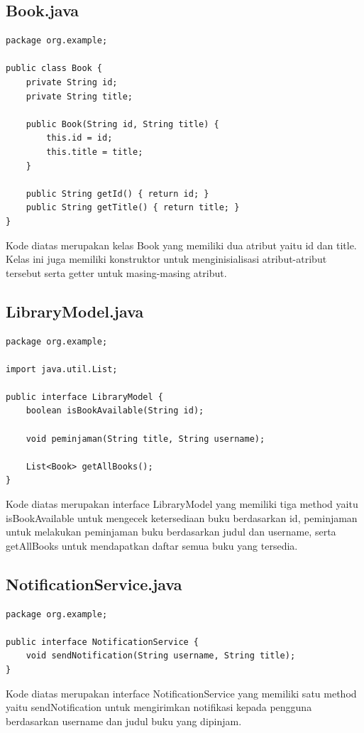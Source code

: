 \documentclass[a4paper,12pt]{article}
\begin{document}
\subsection{Book.java}
\begin{lstlisting}[style=javastyle, caption={Book.java}]
package org.example;

public class Book {
    private String id;
    private String title;

    public Book(String id, String title) {
        this.id = id;
        this.title = title;
    }

    public String getId() { return id; }
    public String getTitle() { return title; }
}
\end{lstlisting}

Kode diatas merupakan kelas Book yang memiliki dua atribut yaitu id dan title. Kelas ini juga memiliki konstruktor untuk menginisialisasi atribut-atribut tersebut serta getter untuk masing-masing atribut.

\subsection{LibraryModel.java}\label{one}
\begin{lstlisting}[style=javastyle, caption={LibraryModel.java}]
package org.example;

import java.util.List;

public interface LibraryModel {
    boolean isBookAvailable(String id);

    void peminjaman(String title, String username);

    List<Book> getAllBooks();
}
\end{lstlisting}

Kode diatas merupakan interface LibraryModel yang memiliki tiga method yaitu isBookAvailable untuk mengecek ketersediaan buku berdasarkan id, peminjaman untuk melakukan peminjaman buku berdasarkan judul dan username, serta getAllBooks untuk mendapatkan daftar semua buku yang tersedia.

\subsection{NotificationService.java}\label{five}
\begin{lstlisting}[style=javastyle, caption={NotificationService.java}]
package org.example;

public interface NotificationService {
    void sendNotification(String username, String title);
}
\end{lstlisting}
Kode diatas merupakan interface NotificationService yang memiliki satu method yaitu sendNotification untuk mengirimkan notifikasi kepada pengguna berdasarkan username dan judul buku yang dipinjam.
\end{document}
